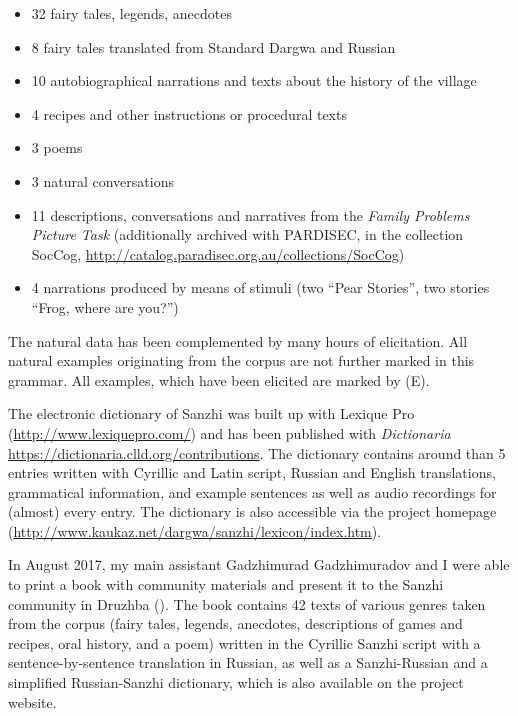 \begin{itemize}
	\item 32 fairy tales, legends, anecdotes
	\item 8 fairy tales translated from Standard Dargwa and Russian
	\item 10 autobiographical narrations and texts about the history of the village
	\item 4 recipes and other instructions or procedural texts
	\item 3 poems
	\item 3 natural conversations
	\item 11 descriptions, conversations and narratives from the \textit{\textit{Family Problems Picture Task}} \citep{SanRoqueEtAl2012} (additionally archived with PARDISEC, in the collection SocCog, \url{http://catalog.paradisec.org.au/collections/SocCog})
	\item 4 narrations produced by means of stimuli (two ``Pear Stories'', two stories ``Frog, where are you?'') 
\end{itemize}

The natural data has been complemented by many hours of elicitation. All natural examples originating from the corpus are not further marked in this grammar. All examples, which have been elicited are marked by (E).


\sloppy The electronic dictionary of Sanzhi was built up with Lexique Pro (\url{http://www.lexiquepro.com/}) and has been published with \textit{Dictionaria} \url{https://dictionaria.clld.org/contributions}. The dictionary contains around than 5 entries written with Cyrillic and Latin script, Russian and English translations, grammatical information, and example sentences as well as audio recordings for (almost) every entry. The dictionary is also accessible via the project homepage (\url{http://www.kaukaz.net/dargwa/sanzhi/lexicon/index.htm}).

In August 2017, my main assistant Gadzhimurad Gadzhimuradov and I were able to print a book with community materials and present it to the Sanzhi community in Druzhba (). The book contains 42 texts of various genres taken from the corpus (fairy tales, legends, anecdotes, descriptions of games and recipes, oral history, and a poem) written in the Cyrillic Sanzhi script with a sentence-by-sentence translation in Russian, as well as a Sanzhi-Russian and a simplified Russian-Sanzhi dictionary, which is also available on the project website.


